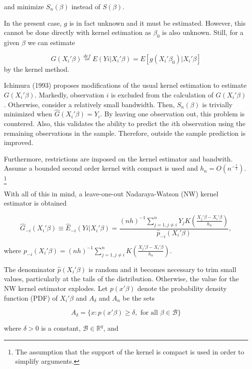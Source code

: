 \documentclass[a4paper]{article}
\begin{document}
and minimize $S_n(\beta)$ instead of $S(\beta)$.


In the present case, $g$ is in fact unknown and it must be estimated. However, this cannot be done directly with kernel estimation as $\beta_0$ is also unknown. Still, for a given $\beta$ we can estimate

\begin{equation}
G(X_i'\beta) \stackrel{def}{=} E(Yi|X_i'\beta) = E[g(X_i'\beta_0)|X_i'\beta]
\end{equation}
 by the kernel method. 

Ichimura (1993) proposes modifications of the usual kernel estimation to estimate $G(X_i'\beta)$. Markedly, observation $i$ is excluded from the calculation of $G(X_i'\beta)$. Otherwise, consider a relatively small bandwidth. Then, $S_n(\beta)$ is trivially minimized when $\hat{G}(X_i'\beta) = Y_i$. By leaving one observation out, this problem is countered. Also, this validates the ability to predict the $i$th observation using the remaining observations in the sample. Therefore, outside the sample prediction is improved. 

Furthermore, restrictions are imposed on the kernel estimator and bandwith. Assume a bounded second order kernel with compact is used and $ h_n = O(n^{-\frac{1}{5}})$. \footnote{The assumption that the support of the kernel is compact is used in order to simplify arguments.}

With all of this in mind, a leave-one-out Nadaraya-Watson (NW) kernel estimator is obtained

\begin{equation}
\hat{G}_{-i}(X_i'\beta) \equiv \hat{E}_{-i}(Yi|X_i'\beta) = \frac{(nh)^{-1}\sum_{j=1, j \neq i }^{n}  Y_jK(\frac{X_j'\beta - X_i'\beta}{h_n})}{\hat{p}_{-i}(X_i'\beta)},
\end{equation}

where $\hat{p}_{-i}(X_i'\beta) = (nh)^{-1}\sum_{j=1,j \neq i}^{n}K(\frac{X_j'\beta - X_i'\beta}{h_n})$.  

The denominator $\hat{p}(X_i'\beta)$ is random and it becomes necessary to trim small values, particularly at the tails of the distribution. Otherwise, the value for the NW kernel estimator explodes. Let $p(x'\beta)$ denote the probability density function (PDF) of $X_i'\beta$ and $A_\delta$ and $A_n$ be the sets

\[ A_\delta = \{ x : p(x'\beta) \geq \delta, \text{ for all }  \beta \in \mathcal{B} \}
\]

where $\delta > 0$ is a constant, $\mathcal{B} \in \mathbb{R}^q$, and
\end{document}
